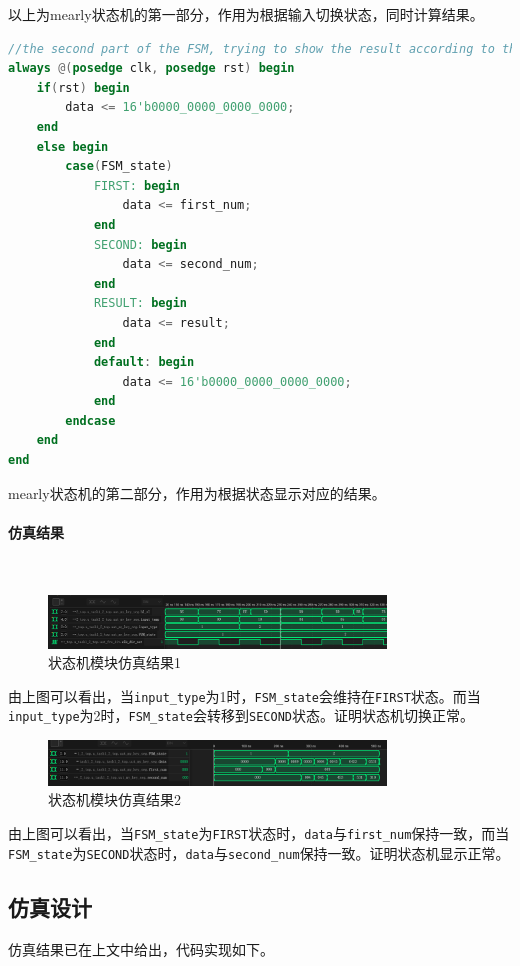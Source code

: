 \documentclass[UTF8]{ctexart}
\newcommand{\subsubsubsection}[1]{\paragraph{#1}\mbox{}\\}
\begin{document}
以上为mearly状态机的第一部分，作用为根据输入切换状态，同时计算结果。
\begin{framed}
	\begin{lstlisting}[language=verilog,style=verilogStyle]
//the second part of the FSM, trying to show the result according to the state
always @(posedge clk, posedge rst) begin
	if(rst) begin
		data <= 16'b0000_0000_0000_0000;
	end
	else begin
		case(FSM_state)
			FIRST: begin
				data <= first_num;
			end
			SECOND: begin
				data <= second_num;
			end
			RESULT: begin
				data <= result;
			end
			default: begin
				data <= 16'b0000_0000_0000_0000;
			end
		endcase
	end
end
    \end{lstlisting}
\end{framed}
mearly状态机的第二部分，作用为根据状态显示对应的结果。
\subsubsubsection{仿真结果}
\begin{figure}[H]
	\centering
	\includegraphics[width=0.8\textwidth]{task1_3_4.png}
	\caption{状态机模块仿真结果1}
\end{figure}
由上图可以看出，当\texttt{input\_type}为1时，\texttt{FSM\_state}会维持在\texttt{FIRST}状态。而当\texttt{input\_type}为2时，\texttt{FSM\_state}会转移到\texttt{SECOND}状态。证明状态机切换正常。
\begin{figure}[H]
	\centering
	\includegraphics[width=0.8\textwidth]{task1_3_5.png}
	\caption{状态机模块仿真结果2}
\end{figure}
由上图可以看出，当\texttt{FSM\_state}为\texttt{FIRST}状态时，\texttt{data}与\texttt{first\_num}保持一致，而当\texttt{FSM\_state}为\texttt{SECOND}状态时，\texttt{data}与\texttt{second\_num}保持一致。证明状态机显示正常。
\subsection{仿真设计}
仿真结果已在上文中给出，代码实现如下。
\end{document}
